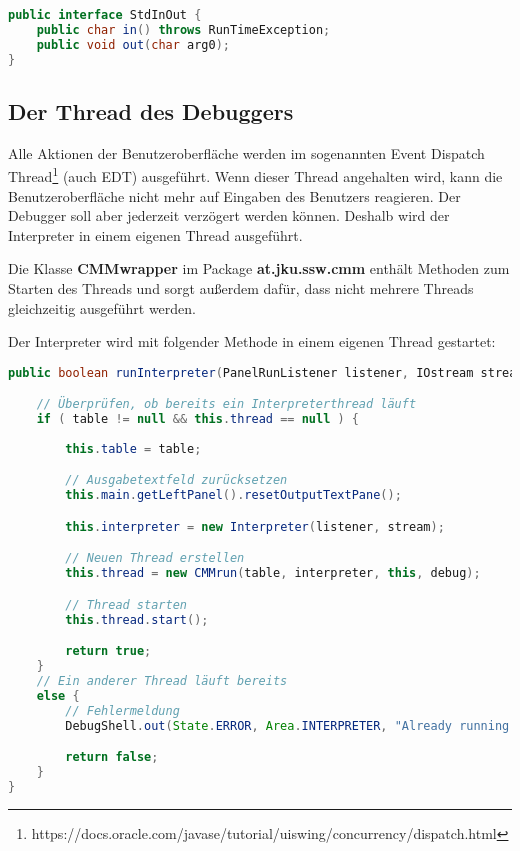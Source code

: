 \begin{lstlisting}[language=JAVA]
public interface StdInOut {
	public char in() throws RunTimeException;
	public void out(char arg0);
}
\end{lstlisting}


\subsection{Der Thread des Debuggers}
Alle Aktionen der Benutzeroberfläche werden im sogenannten Event Dispatch Thread\footnote{https://docs.oracle.com/javase/tutorial/uiswing/concurrency/dispatch.html} (auch EDT) ausgeführt. Wenn dieser Thread angehalten wird, kann die Benutzeroberfläche nicht mehr auf Eingaben des Benutzers reagieren. Der Debugger soll aber jederzeit verzögert werden können. Deshalb wird der Interpreter in einem eigenen Thread ausgeführt.

Die Klasse \textbf{CMMwrapper} im Package \textbf{at.jku.ssw.cmm} enthält Methoden zum Starten des Threads und sorgt außerdem dafür, dass nicht mehrere Threads gleichzeitig ausgeführt werden.

Der Interpreter wird mit folgender Methode in einem eigenen Thread gestartet:
\begin{lstlisting}[language=JAVA]
public boolean runInterpreter(PanelRunListener listener, IOstream stream, Tab table) {

	// Überprüfen, ob bereits ein Interpreterthread läuft
	if ( table != null && this.thread == null ) {
			
		this.table = table;

		// Ausgabetextfeld zurücksetzen
		this.main.getLeftPanel().resetOutputTextPane();

		this.interpreter = new Interpreter(listener, stream);

		// Neuen Thread erstellen
		this.thread = new CMMrun(table, interpreter, this, debug);

		// Thread starten
		this.thread.start();

		return true;
	}
	// Ein anderer Thread läuft bereits
	else {
		// Fehlermeldung
		DebugShell.out(State.ERROR, Area.INTERPRETER, "Already running or not compiled!");

		return false;
	}
}
\end{lstlisting}

